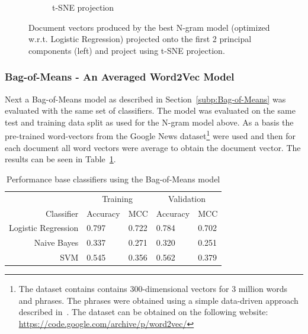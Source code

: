 \begin{figure}[h]
\begin{subfigure}[b]{0.48\textwidth}
      \caption{t-SNE projection}
      \label{fig:exp-vector-space-ngram-tsne}
    \end{subfigure}
    \caption{Document vectors produced by the best N-gram model (optimized w.r.t. Logistic Regression) projected onto the first 2 principal components (left) and project using t-SNE projection.}
  \label{fig:exp-vector-space-ngram}
\end{figure}

\subsubsection{Bag-of-Means - An Averaged Word2Vec Model}

Next a Bag-of-Means model as described in Section~\ref{subp:Bag-of-Means} was evaluated with the same set of classifiers. The model was evaluated on the same test and training data split as used for the N-gram model above. As a basis the pre-trained word-vectors from the Google News dataset\footnote{The dataset contains contains 300-dimensional vectors for 3 million words and phrases. The phrases were obtained using a simple data-driven approach described in~\cite{Mikolov:2013ab}. The dataset can be obtained on the following website: \url{https://code.google.com/archive/p/word2vec/}} were used and then for each document all word vectors were average to obtain the document vector. The results can be seen in Table~\ref{tab:Bag-Of-Means Results}.

\begin{table}[h]
  \begin{center}
  \begin{tabular}{ r | *2l | *2l }
    \toprule
     & \multicolumn{2}{c|}{Training} & \multicolumn{2}{|c}{Validation}\\
    Classifier & Accuracy & MCC & Accuracy & MCC \\
    \midrule
    Logistic Regression & 0.797 & 0.722 & 0.784 & 0.702 \\
    Naive Bayes         & 0.337 & 0.271 & 0.320 & 0.251 \\
    SVM                 & 0.545 & 0.356 & 0.562 & 0.379 \\
    \bottomrule
  \end{tabular}
  \caption{Performance base classifiers using the Bag-of-Means model}
\label{tab:Bag-Of-Means Results}
\end{center}
\end{table}

